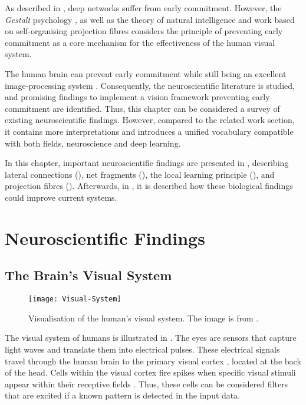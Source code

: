 As described in , deep networks suffer from early commitment.
However, the \emph{Gestalt} psychology \cite{ellis_source_1938, kohler_gestalt_1992, wagemans_century_2012, hamlyn_psychology_2017}, as well as the theory of natural intelligence \cite{von_der_malsburg_theory_2022} and work based on self-organising projection fibres \cite{bienenstock_neural_1987, lades_distortion_1993, wiskott_face_1996, fernandes_self-organization_2015} considers the principle of preventing early commitment as a core mechanism for the effectiveness of the human visual system.

The human brain can prevent early commitment \cite{marr_vision_2010} while still being an excellent image-processing system \cite{ellis_source_1938, kohler_gestalt_1992, wagemans_century_2012, hamlyn_psychology_2017}. 
Consequently, the neuroscientific literature is studied, and promising findings to implement a vision framework preventing early commitment are identified.
Thus, this chapter can be considered a survey of existing neuroscientific findings.
However, compared to the related work section, it contains more interpretations and introduces a unified vocabulary compatible with both fields, neuroscience and deep learning.

In this chapter, important neuroscientific findings are presented in , describing lateral connections (), net fragments (), the local learning principle (), and projection fibres ().
Afterwards, in , it is described how these biological findings could improve current systems.



\section{Neuroscientific Findings}

\subsection{The Brain's Visual System}
\begin{figure}[h]
    \centering
    \texttt{[image: Visual-System]}
    \caption[Visualisation of the human's visual system]{Visualisation of the human's visual system. The image is from .}
\end{figure}
%
The visual system of humans is illustrated in . The eyes are sensors that capture light waves and translate them into electrical pulses. These electrical signals travel through the human brain to the primary visual cortex , located at the back of the head.
Cells within the visual cortex fire spikes when specific visual stimuli appear within their receptive fields \cite{grill-spector_human_2004}. Thus, these cells can be considered filters that are excited if a known pattern is detected in the input data. 

